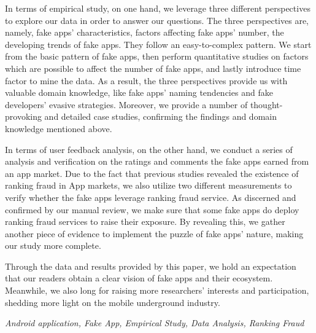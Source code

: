 In terms of empirical study, on one hand, we leverage three different perspectives to explore our data in order to answer our questions.
The three perspectives are, namely, fake apps' characteristics, factors affecting fake apps' number, the developing trends of fake apps.
They follow an easy-to-complex pattern.
We start from the basic pattern of fake apps, then perform quantitative studies on factors which are possible to affect the number of fake apps, and lastly introduce time factor to mine the data.
As a result, the three perspectives provide us with valuable domain knowledge, like fake apps’ naming tendencies and fake developers’ evasive strategies.
Moreover, we provide a number of thought-provoking and detailed case studies, confirming the findings and domain knowledge mentioned above.

In terms of user feedback analysis, on the other hand, we conduct a series of analysis and verification on the ratings and comments the fake apps earned from an app market.
Due to the fact that previous studies revealed the existence of ranking fraud in App markets, we also utilize two different measurements to verify whether the fake apps leverage ranking fraud service.
As discerned and confirmed by our manual review, we make sure that some fake apps do deploy ranking fraud services to raise their exposure.
By revealing this, we gather another piece of evidence to implement the puzzle of fake apps' nature, making our study more complete.

Through the data and results provided by this paper, we hold an expectation that our readers obtain a clear vision of fake apps and their ecosystem.
Meanwhile, we also long for raising more researchers' interests and participation, shedding more light on the mobile underground industry.

{} \textit{Android application, Fake App, Empirical Study, Data Analysis, Ranking Fraud}
